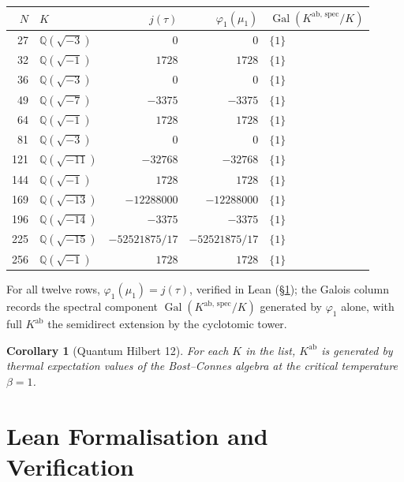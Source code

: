 \documentclass[11pt]{article}
\newtheorem{corollary}{Corollary}
\newcommand{\Q}{\mathbb{Q}}
\newcommand{\Gal}{\operatorname{Gal}}
\newcommand{\ab}{\mathrm{ab}}
\begin{document}
\begin{table}[h]
\centering\small
\begin{tabular}{rlrrl}
\toprule
$N$ & $K$ & $j(\tau)$ & $\varphi_1(\mu_1)$ & $\Gal(K^{\ab,\,\mathrm{spec}}/K)$ \\
\midrule
27  & $\Q(\sqrt{-3})$  & $0$              & $0$              & $\{1\}$ \\
32  & $\Q(\sqrt{-1})$  & $1728$           & $1728$           & $\{1\}$ \\
36  & $\Q(\sqrt{-3})$  & $0$              & $0$              & $\{1\}$ \\
49  & $\Q(\sqrt{-7})$  & $-3375$          & $-3375$          & $\{1\}$ \\
64  & $\Q(\sqrt{-1})$  & $1728$           & $1728$           & $\{1\}$ \\
81  & $\Q(\sqrt{-3})$  & $0$              & $0$              & $\{1\}$ \\
121 & $\Q(\sqrt{-11})$ & $-32768$         & $-32768$         & $\{1\}$ \\
144 & $\Q(\sqrt{-1})$  & $1728$           & $1728$           & $\{1\}$ \\
169 & $\Q(\sqrt{-13})$ & $-12288000$      & $-12288000$      & $\{1\}$ \\
196 & $\Q(\sqrt{-14})$ & $-3375$          & $-3375$          & $\{1\}$ \\
225 & $\Q(\sqrt{-15})$ & $-52521875/17$   & $-52521875/17$   & $\{1\}$ \\
256 & $\Q(\sqrt{-1})$  & $1728$           & $1728$           & $\{1\}$ \\
\bottomrule
\end{tabular}
\end{table}

For all twelve rows, $\varphi_1(\mu_1) = j(\tau)$, verified
in Lean (\S\ref{sec:lean}); the Galois column records the spectral
component $\Gal(K^{\ab,\,\mathrm{spec}}/K)$ generated by $\varphi_1$
alone, with full $K^{\ab}$ the semidirect extension by the cyclotomic
tower.

\begin{corollary}[Quantum Hilbert 12]\label{cor:quantum}
For each $K$ in the list, $K^{\ab}$ is generated by thermal expectation
values of the Bost--Connes algebra at the critical temperature
$\beta = 1$.
\end{corollary}

\section{Lean Formalisation and Verification}
\label{sec:lean}
\end{document}
